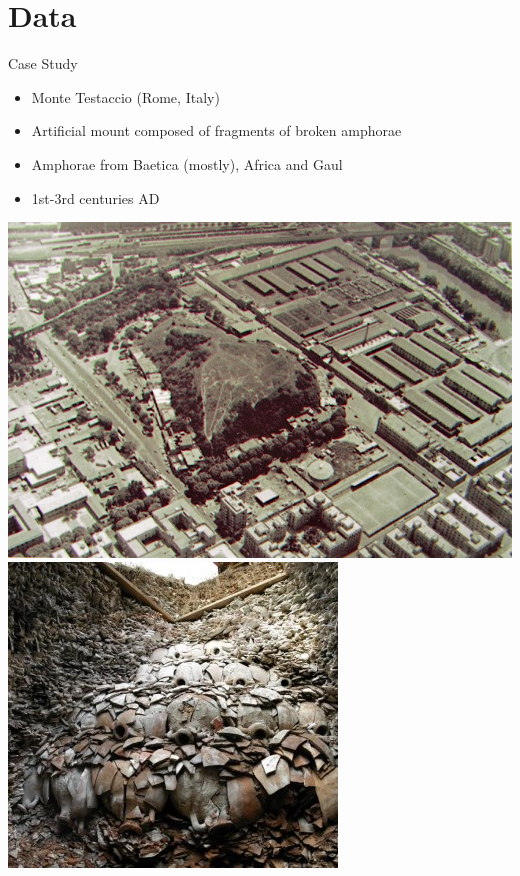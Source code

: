 \documentclass[12pt, handout=show,notes=show]{beamer}
\begin{document}
\section{Data}

\begin{frame}{Case Study}
\begin{itemize}

\item Monte Testaccio (Rome, Italy)
\item Artificial mount composed of fragments of broken amphorae 
\item Amphorae from Baetica (mostly), Africa and Gaul	
\item 1st-3rd centuries AD

\end{itemize}

\begin{center}
		\includegraphics[height=0.3\textwidth]{./Mount-Testaccio2.jpg}
		\hfil \includegraphics[height=0.3\textwidth]{./Mount-Testaccio.jpg}\\
		\vfill
	
\end{center}		

\end{frame}
\end{document}
